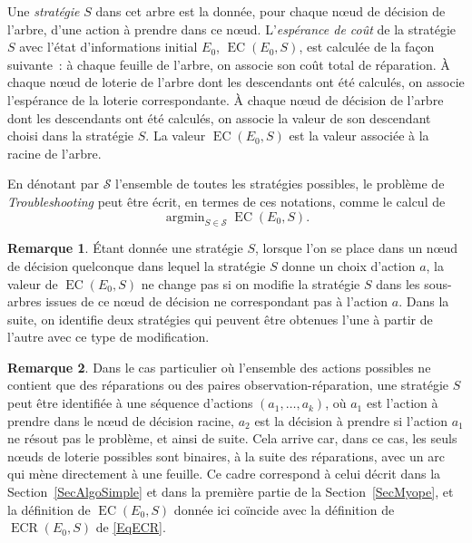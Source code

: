 \documentclass[a4paper,11pt]{article}
\theoremstyle{plain}
\theoremstyle{definition}
\newtheorem*{remk}{Remarque}
\DeclareMathOperator*{\argmin}{argmin}
\DeclareMathOperator{\ECR}{ECR}
\DeclareMathOperator{\EC}{EC}
\begin{document}
Une \emph{stratégie} $S$ dans cet arbre est la donnée, pour chaque nœud de décision de l'arbre, d'une action à prendre dans ce nœud. L'\emph{espérance de coût} de la stratégie $S$ avec l'état d'informations initial $E_0$, $\EC(E_0, S)$, est calculée de la façon suivante~: à chaque feuille de l'arbre, on associe son coût total de réparation. À chaque nœud de loterie de l'arbre dont les descendants ont été calculés, on associe l'espérance de la loterie correspondante. À chaque nœud de décision de l'arbre dont les descendants ont été calculés, on associe la valeur de son descendant choisi dans la stratégie $S$. La valeur $\EC(E_0, S)$ est la valeur associée à la racine de l'arbre.

En dénotant par $\mathcal S$ l'ensemble de toutes les stratégies possibles, le problème de \emph{Troubleshooting} peut être écrit, en termes de ces notations, comme le calcul de
\begin{equation}
\label{MainProblem}
\argmin_{S \in \mathcal S} \EC(E_0, S).
\end{equation}

\begin{remk}
Étant donnée une stratégie $S$, lorsque l'on se place dans un nœud de décision quelconque dans lequel la stratégie $S$ donne un choix d'action $a$, la valeur de $\EC(E_0, S)$ ne change pas si on modifie la stratégie $S$ dans les sous-arbres issues de ce nœud de décision ne correspondant pas à l'action $a$. Dans la suite, on identifie deux stratégies qui peuvent être obtenues l'une à partir de l'autre avec ce type de modification.
\end{remk}

\begin{remk}
Dans le cas particulier où l'ensemble des actions possibles ne contient que des réparations ou des paires observation-réparation, une stratégie $S$ peut être identifiée à une séquence d'actions $(a_1, \dotsc, a_k)$, où $a_1$ est l'action à prendre dans le nœud de décision racine, $a_2$ est la décision à prendre si l'action $a_1$ ne résout pas le problème, et ainsi de suite. Cela arrive car, dans ce cas, les seuls nœuds de loterie possibles sont binaires, à la suite des réparations, avec un arc qui mène directement à une feuille. Ce cadre correspond à celui décrit dans la Section~\ref{SecAlgoSimple} et dans la première partie de la Section~\ref{SecMyope}, et la définition de $\EC(E_0, S)$ donnée ici coïncide avec la définition de $\ECR(E_0, S)$ de \eqref{EqECR}.
\end{remk}
\end{document}
